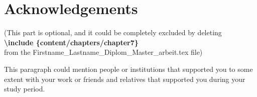 \chapter{Acknowledgements}

(This part is optional, and it could be completely excluded by deleting \\ 
\textbf{ \textbackslash include \{content/chapters/chapter7\}} \\
from the Firstname\_Lastname\_Diplom\_Master\_arbeit.tex file)

This paragraph could mention people or institutions that supported you to some extent with your work or friends and relatives that supported you during your study period. 
